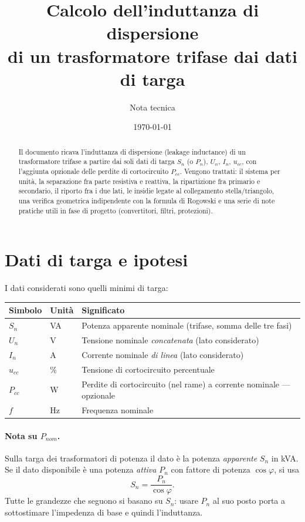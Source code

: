 \documentclass[11pt,a4paper]{article}
\title{Calcolo dell'induttanza di dispersione\\di un trasformatore trifase dai dati di targa}
\author{Nota tecnica}
\date{\today}
\begin{document}
\maketitle

\begin{abstract}
\noindent
Il documento ricava l'induttanza di dispersione (leakage inductance) di un trasformatore
trifase a partire dai soli dati di targa $S_n$ (o $P_n$), $U_n$, $I_n$, $u_{cc}$, con
l'aggiunta opzionale delle perdite di cortocircuito $P_{cc}$. Vengono trattati: il sistema
per unità, la separazione fra parte resistiva e reattiva, la ripartizione fra primario e
secondario, il riporto fra i due lati, le insidie legate al collegamento
stella/triangolo, una verifica geometrica indipendente con la formula di Rogowski e una
serie di note pratiche utili in fase di progetto (convertitori, filtri, protezioni).
\end{abstract}

\tableofcontents

\section{Dati di targa e ipotesi}

I dati considerati sono quelli minimi di targa:

\begin{center}
\begin{tabular}{llp{7.6cm}}
\toprule
Simbolo & Unità & Significato \\
\midrule
$S_n$      & VA & Potenza apparente nominale (trifase, somma delle tre fasi) \\
$U_n$      & V  & Tensione nominale \emph{concatenata} (lato considerato) \\
$I_n$      & A  & Corrente nominale \emph{di linea} (lato considerato) \\
$u_{cc}$   & \% & Tensione di cortocircuito percentuale \\
$P_{cc}$   & W  & Perdite di cortocircuito (nel rame) a corrente nominale --- opzionale \\
$f$        & Hz & Frequenza nominale \\
\bottomrule
\end{tabular}
\end{center}

\paragraph{Nota su $P_{nom}$.} Sulla targa dei trasformatori di potenza il dato
è la potenza \emph{apparente} $S_n$ in kVA. Se il dato disponibile è una potenza
\emph{attiva} $P_n$ con fattore di potenza $\cos\varphi$, si usa
\begin{equation}
S_n = \frac{P_n}{\cos\varphi}.
\end{equation}
Tutte le grandezze che seguono si basano su $S_n$: usare $P_n$ al suo posto porta a
sottostimare l'impedenza di base e quindi l'induttanza.
\end{document}
